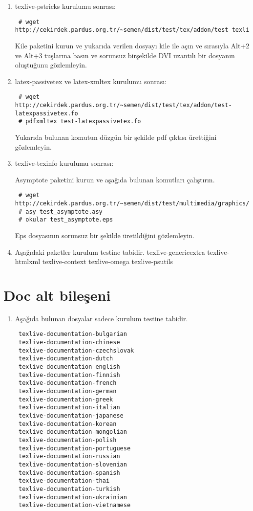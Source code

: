 \documentclass[a4paper,10pt]{article}
\begin{document}
\begin{enumerate}
\item texlive-pstricks kurulumu sonrası:
\begin{verbatim}
 # wget http://cekirdek.pardus.org.tr/~semen/dist/test/tex/addon/test_texlivepstricks.tex
\end{verbatim}

Kile paketini kurun ve yukarıda verilen dosyayı kile ile açın ve sırasıyla Alt+2 ve Alt+3 tuşlarına basın ve sorunsuz birşekilde DVI uzantılı bir dosyanın oluştuğunu gözlemleyin.
\item  latex-passivetex ve latex-xmltex kurulumu sonrası:
\begin{verbatim}
 # wget http://cekirdek.pardus.org.tr/~semen/dist/test/tex/addon/test-latexpassivetex.fo
 # pdfxmltex test-latexpassivetex.fo
\end{verbatim}

Yukarıda bulunan komutun düzgün bir şekilde pdf çıktısı ürettiğini gözlemleyin.

\item texlive-texinfo kurulumu sonrası:

Asymptote paketini kurun ve aşağıda bulunan komutları çalıştırın.
\begin{verbatim}
 # wget http://cekirdek.pardus.org.tr/~semen/dist/test/multimedia/graphics/test_asymptote.asy
 # asy test_asymptote.asy
 # okular test_asymptote.eps
\end{verbatim}

Eps dosyasının sorunsuz bir şekilde üretildiğini gözlemleyin.

\item Aşağıdaki paketler kurulum testine tabidir.
texlive-genericextra
texlive-htmlxml
texlive-context
texlive-omega
texlive-psutils
\end{enumerate}
\section{Doc alt bileşeni} 
\begin{enumerate}
\item  Aşağıda bulunan dosyalar sadece kurulum testine tabidir.

\begin{verbatim}
 texlive-documentation-bulgarian
 texlive-documentation-chinese
 texlive-documentation-czechslovak
 texlive-documentation-dutch
 texlive-documentation-english
 texlive-documentation-finnish
 texlive-documentation-french
 texlive-documentation-german
 texlive-documentation-greek
 texlive-documentation-italian
 texlive-documentation-japanese
 texlive-documentation-korean
 texlive-documentation-mongolian
 texlive-documentation-polish
 texlive-documentation-portuguese
 texlive-documentation-russian
 texlive-documentation-slovenian
 texlive-documentation-spanish
 texlive-documentation-thai
 texlive-documentation-turkish
 texlive-documentation-ukrainian
 texlive-documentation-vietnamese
\end{verbatim}

\end{enumerate}
\end{document}
